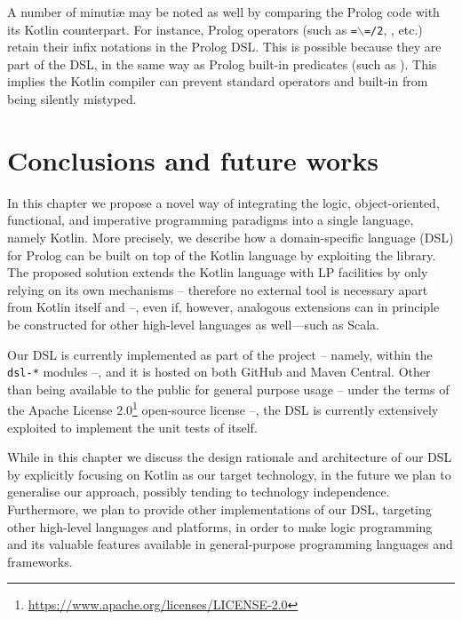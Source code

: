 \documentclass[12pt,a4paper,openright,twoside]{book}
\begin{document}
A number of minuti\ae{} may be noted as well by comparing the Prolog code with its Kotlin counterpart.
%
For instance, Prolog operators (such as \texttt{=$\backslash$=/2}, , etc.) retain their infix notations in the Prolog DSL.
%
This is possible because they are part of the DSL, in the same way as Prolog built-in predicates (such as ).
%
This implies the Kotlin compiler can prevent standard operators and built-in from being silently mistyped.

\section{Conclusions and future works}\label{sec:conclusions}

In this chapter we propose a novel way of integrating the logic, object-oriented, functional, and imperative programming paradigms into a single language, namely Kotlin.
%
More precisely, we describe how a domain-specific language (DSL) for Prolog can be built on top of the Kotlin language by exploiting the \twopkt{} library.
%
The proposed solution extends the Kotlin language with LP facilities by only relying on its own mechanisms -- therefore no external tool is necessary apart from Kotlin itself and \twopkt{} --, even if, however, analogous extensions can in principle be constructed for other high-level languages as well---such as Scala.

Our DSL is currently implemented as part of the \twopkt{} project -- namely, within the \texttt{dsl-*} modules --, and it is hosted on both GitHub \cite{homepage2PKt} and Maven Central.
%
Other than being available to the public for general purpose usage -- under the terms of the Apache License 2.0\footnote{\url{https://www.apache.org/licenses/LICENSE-2.0}} open-source license --, the DSL is currently extensively exploited to implement the unit tests of \twopkt{} itself.

While in this chapter we discuss the design rationale and architecture of our DSL by explicitly focusing on Kotlin as our target technology, in the future we plan to generalise our approach, possibly tending to technology independence.
%
Furthermore, we plan to provide other implementations of our DSL, targeting other high-level languages and platforms, in order to make logic programming and its valuable features available in general-purpose programming languages and frameworks.
\end{document}
